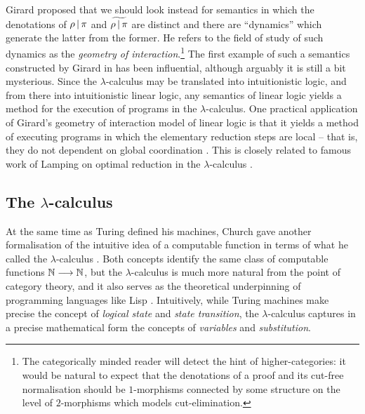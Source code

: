 \documentclass[english,letter paper,12pt,reqno]{article}
\theoremstyle{example}
\numberwithin{equation}{section}
\begin{document}
Girard proposed \cite{girard_towards} that we should look instead for semantics in which the denotations of $\rho \,|\, \pi$ and $\widetilde{\rho\,|\,\pi}$ are distinct and there are ``dynamics'' which generate the latter from the former. He refers to the field of study of such dynamics as the \emph{geometry of interaction}.\footnote{The categorically minded reader will detect the hint of higher-categories: it would be natural to expect that the denotations of a proof and its cut-free normalisation should be $1$-morphisms connected by some structure on the level of $2$-morphisms which models cut-elimination.} The first example of such a semantics constructed by Girard in \cite{girard_goi1} has been influential, although arguably it is still a bit mysterious. Since the $\lambda$-calculus may be translated into intuitionistic logic, and from there into intuitionistic linear logic, any semantics of linear logic yields a method for the execution of programs in the $\lambda$-calculus. One practical application of Girard's geometry of interaction model of linear logic is that it yields a method of executing programs in which the elementary reduction steps are local -- that is, they do not dependent on global coordination \cite{danos_regnier1,danos_regnier2}. This is closely related to famous work of Lamping on optimal reduction in the $\lambda$-calculus \cite{Gonthier}.

\subsection{The $\lambda$-calculus}\label{section:lambda_calc}

At the same time as Turing defined his machines, Church gave another formalisation of the intuitive idea of a computable function in terms of what he called the $\lambda$-calculus \cite{church,selinger}. Both concepts identify the same class of computable functions $\mathbb{N} \longrightarrow \mathbb{N}$, but the $\lambda$-calculus is much more natural from the point of category theory, and it also serves as the theoretical underpinning of programming languages like Lisp \cite{mccarthy}. Intuitively, while Turing machines make precise the concept of \emph{logical state} and \emph{state transition}, the $\lambda$-calculus captures in a precise mathematical form the concepts of \emph{variables} and \emph{substitution}. 
\end{document}
